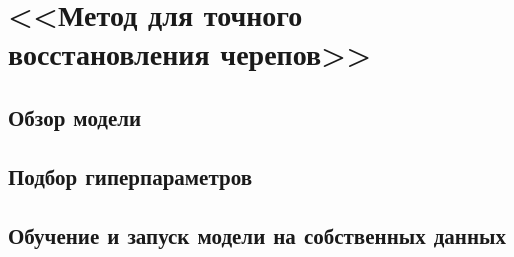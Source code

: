 \chapter{<<Метод для точного восстановления черепов>>}

\section{Обзор модели}
\section{Подбор гиперпараметров}
\section{Обучение и запуск модели на собственных данных}

